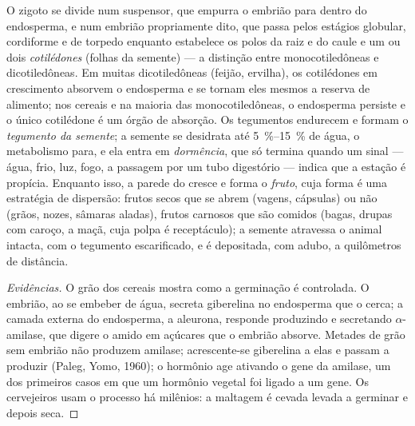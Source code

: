 \begin{definition}\label{def:b2:angiosperm-reproduction:seed}
O zigoto se divide num suspensor, que empurra o embrião para dentro do
endosperma, e num embrião propriamente dito, que passa pelos estágios
globular, cordiforme e de torpedo enquanto estabelece os polos da raiz
e do caule e um ou dois \emph{cotilédones} (folhas da semente) --- a
distinção entre monocotiledôneas e dicotiledôneas. Em muitas
dicotiledôneas (feijão, ervilha), os cotilédones em crescimento
absorvem o endosperma e se tornam eles mesmos a reserva de alimento;
nos cereais e na maioria das monocotiledôneas, o endosperma persiste e
o único cotilédone é um órgão de absorção. Os tegumentos endurecem e
formam o \emph{tegumento da semente}; a semente se desidrata até
\qtyrange{5}{15}{\%} de água, o metabolismo para, e ela entra em
\emph{dormência}, que só termina quando um sinal --- água, frio, luz,
fogo, a passagem por um tubo digestório --- indica que a estação é
propícia. Enquanto isso, a parede do  cresce e forma o
\emph{fruto}, cuja forma é uma estratégia de dispersão: frutos secos
que se abrem (vagens, cápsulas) ou não (grãos, nozes, sâmaras aladas),
frutos carnosos que são comidos (bagas, drupas com caroço, a maçã,
cuja polpa é receptáculo); a semente atravessa o animal intacta, com o
tegumento escarificado, e é depositada, com adubo, a quilômetros de
distância.
\end{definition}
\begin{proof}[Evidências]
O grão dos cereais mostra como a germinação é controlada. O embrião, ao
se embeber de água, secreta giberelina no endosperma que o cerca; a
camada externa do endosperma, a aleurona, responde produzindo e
secretando $\alpha$-amilase, que digere o amido em açúcares que o
embrião absorve. Metades de grão sem embrião não produzem amilase;
acrescente-se giberelina a elas e passam a produzir (Paleg, Yomo,
1960); o hormônio age ativando o gene da amilase, um dos primeiros
casos em que um hormônio vegetal foi ligado a um gene. Os cervejeiros
usam o processo há milênios: a maltagem é cevada levada a germinar e
depois seca.
\end{proof}

